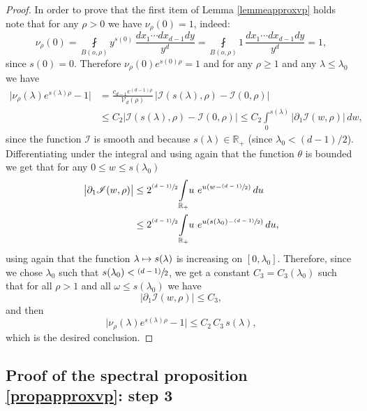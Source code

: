 \documentclass[10pt]{amsart}
\let\mathcal\mathscr
\newcommand{\psfrac}[2]{\sfrac{(#1)}{#2}}
\def\mto{\mathchoice{\longmapsto}{\mapsto}{\mapsto}{\mapsto}}
\theoremstyle{plain}
\theoremstyle{definition}
\newcommand{\RR}{\mathbb{R}}
\newcommand{\inte}[1]{\underset{#1}{\int}}
\newcommand{\finte}[3]{\underset{#1}{\fint} {#2} \, {#3}}
\begin{document}
\begin{proof}
In order to prove that the first item of Lemma \ref{lemmeapproxvp} holds note that for any $\rho > 0$ we have $ \nu_{\rho}(0) = 1$, indeed:
\[
\nu_{\rho}(0) = \finte{B(o, \rho)}{ y^{s(0)}}{ \frac{dx_1\cdots dx_{d-1} dy}{y^d}} = \finte{B(o, \rho)}{1}{ \frac{dx_1\cdots dx_{d-1} dy}{y^d}} = 1,
\]
since $s(0) = 0$. Therefore $\nu_{\rho}(0) e^{s(0) \rho} = 1$ and for any $\rho \ge 1$ and any $\lambda \le \lambda_0$ we have
\begin{align*}
\bigl| \nu_{\rho}(\lambda) e^{s(\lambda) \rho} - 1 \bigr| & = \frac{ c_{d-1} e^{(d-1)\rho}} {\mathcal{V}_d(\rho)} \, \bigl| \mathcal{I}(s(\lambda),\rho) - \mathcal{I}(0,\rho) \bigr| \\
& \le C_2 \bigl| \mathcal{I}(s(\lambda),\rho) - \mathcal{I}(0,\rho) \bigr|  \le C_2 \inte{0}^{s(\lambda)} \bigl| \partial_1 \mathcal{I}(w,\rho) \bigr| \,dw,
\end{align*}
since the function $\mathcal{I}$ is smooth and because $s(\lambda) \in \RR_+$ (since $\lambda_0 < (d-1)/2$). Differentiating under the integral and using again that the function $\theta$ is bounded we get that for any $ 0 \le w \le s(\lambda_0)$
\begin{align*}
\bigl| \partial_1 \mathcal{I}(w,\rho) \bigr| & \le 2^{ \psfrac{d-1}{2}} \inte{\RR_+} u \ e^{ u \left(w -\psfrac{d-1}{2} \right) } \,du \\
& \le 2^{ \psfrac{d-1}{2}} \inte{\RR_+} u \ e^{ u \left(s(\lambda_0) -\psfrac{d-1}{2} \right) } \,du,
\end{align*}
using again that the function $\lambda \mto s(\lambda)$ is increasing on $[0, \lambda_0]$. Therefore, since we chose $\lambda_0$ such that $s(\lambda_0) < \psfrac{d-1}{2}$, we get a constant $C_3 = C_3(\lambda_0)$ such that for all $\rho > 1$ and all $\omega \le s(\lambda_0)$ we have
\[
\bigl| \partial_1 \mathcal{I}(w,\rho) \bigr| \le C_3,
\]
and then
\[
\bigl| \nu_{\rho}(\lambda) e^{s(\lambda) \rho} - 1 \bigr| \le C_2 \, C_3 \, s(\lambda),
\]
which is the desired conclusion.
\end{proof}

\subsection{Proof of the spectral proposition \ref{propapproxvp}: step 3}
\end{document}
